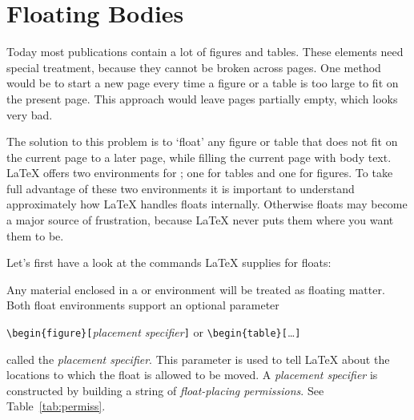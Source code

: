 \section{Floating Bodies}
Today most publications contain a lot of figures and tables. These
elements need special treatment, because they cannot be broken across
pages.  One method would be to start a new page every time a figure or
a table is too large to fit on the present page. This approach would
leave pages partially empty, which looks very bad.

The solution to this problem is to `float' any figure or table that
does not fit on the current page to a later page, while filling the
current page with body text. \LaTeX{} offers two environments for
; one for tables and  one for figures.  To
take full advantage of these two environments it is important to
understand approximately how \LaTeX{} handles floats internally.
Otherwise floats may become a major source of frustration, because
\LaTeX{} never puts them where you want them to be.

\bigskip
Let's first have a look at the commands \LaTeX{} supplies
for floats:

Any material enclosed in a  or  environment will
be treated as floating matter. Both float environments support an optional
parameter
\begin{lscommand}
\verb|\begin{figure}[|\emph{placement specifier}\verb|]| or
\verb|\begin{table}[|\ldots\verb|]|
\end{lscommand}
\noindent called the \emph{placement specifier}. This parameter
is used to tell \LaTeX{} about the locations to which the float
is allowed to be moved.  A \emph{placement specifier} is constructed by building a string
of \emph{float-placing permissions}. See Table~\ref{tab:permiss}.

